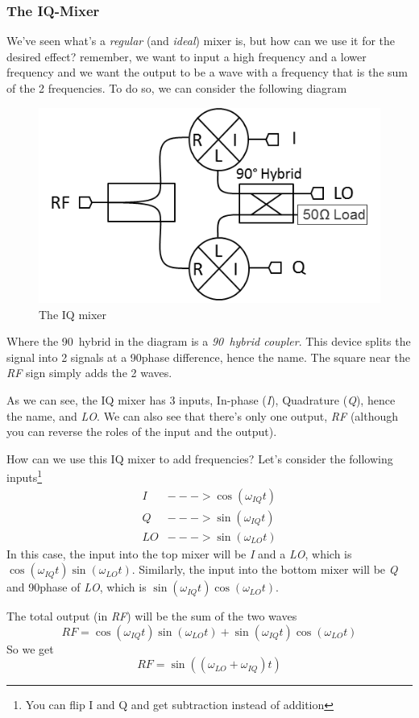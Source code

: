 \subsubsection{The IQ-Mixer}
We've seen what's a \textit{regular} (and \textit{ideal}) mixer is, but how can we use it for the desired effect? remember, we want to input a high frequency and a lower frequency and we want the output to be a wave with a frequency that is the sum of the 2 frequencies. To do so, we can consider the following diagram
\begin{figure}[H]
    \centering
    \includegraphics[width=0.5\columnwidth]{IQ-Mixer.png}
    \caption{The IQ mixer}
    \label{fig:IQ-Mixer}
\end{figure}
Where the 90\degree\ hybrid in the diagram is a \textit{90\degree\  hybrid coupler}. This device splits the signal into 2 signals at a 90\degree phase difference, hence the name. The square near the \textit{RF} sign simply adds the 2 waves.

As we can see, the IQ mixer has 3 inputs, In-phase (\textit{I}), Quadrature (\textit{Q}), hence the name, and \textit{LO}. We can also see that there's only one output, \textit{RF} (although you can reverse the roles of the input and the output).

How can we use this IQ mixer to add frequencies? Let's consider the following inputs\footnote{You can flip I and Q and get subtraction instead of addition}
\begin{align*}
    I &---> \cos (\omega_{IQ} t)\\
    Q &---> \sin (\omega_{IQ} t)\\
    LO &---> \sin (\omega_{LO}t)
\end{align*}
In this case, the input into the top mixer will be \textit{I} and a \textit{LO}, which is $\cos (\omega_{IQ}t)\sin (\omega_{LO}t)$. Similarly, the input into the bottom mixer will be \textit{Q} and 90\degree phase of \textit{LO}, which is $\sin (\omega_{IQ}t)\cos (\omega_{LO}t)$.

The total output (in \textit{RF}) will be the sum of the two waves
$$RF = \cos (\omega_{IQ}t)\sin (\omega_{LO}t) + \sin (\omega_{IQ}t)\cos (\omega_{LO}t)$$
So we get
\begin{equation}
    \boxed{RF = \sin ( (\omega_{LO} + \omega_{IQ})t)}
\end{equation}

